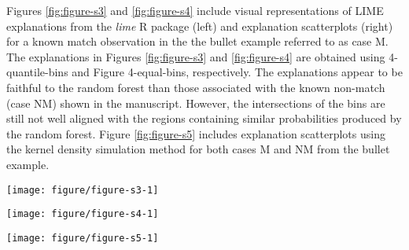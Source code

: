 \documentclass[9pt]{article}\usepackage[]{graphicx}\usepackage[]{color}
\newenvironment{knitrout}{}{} %
\begin{document}
Figures \ref{fig:figure-s3} and \ref{fig:figure-s4} include visual representations of LIME explanations from the \emph{lime} R package (left) and explanation scatterplots (right) for a known match observation in the the bullet example referred to as case M. The explanations in Figures \ref{fig:figure-s3} and \ref{fig:figure-s4} are obtained using 4-quantile-bins and Figure 4-equal-bins, respectively. The explanations appear to be faithful to the random forest than those associated with the known non-match (case NM) shown in the manuscript. However, the intersections of the bins are still not well aligned with the regions containing similar probabilities produced by the random forest. Figure \ref{fig:figure-s5} includes explanation scatterplots using the kernel density simulation method for both cases M and NM from the bullet example.

\vspace{0.5cm}



\renewcommand{\thefigure}{S3}
\begin{figure*}[!h]
\begin{knitrout}
\color{fgcolor}

{\centering \texttt{[image: figure/figure-s3-1]} 

}



\end{knitrout}
\caption{Explanation plot from \emph{lime} R package (left) and explanation scatterplot (right) for case M in the bullet test data for 4-quantile-bins.}
\label{fig:figure-s3}
\end{figure*}

\renewcommand{\thefigure}{S4}
\begin{figure*}[!h]
\begin{knitrout}
\color{fgcolor}

{\centering \texttt{[image: figure/figure-s4-1]} 

}



\end{knitrout}
\caption{Explanation plot from \emph{lime} R package (left) and explanation scatterplot (right) for case M in the bullet test data for 4-equal-bins.}
\label{fig:figure-s4}
\end{figure*}

\renewcommand{\thefigure}{S5}
\begin{figure*}[!h]
\begin{knitrout}
\color{fgcolor}

{\centering \texttt{[image: figure/figure-s5-1]} 

}



\end{knitrout}
\caption{Explanation scatterplots for LIME explanations using kernel density simulation for the cases M (top) and NM (bottom) of the bullet comparison test data.}
\label{fig:figure-s5}
\end{figure*}
\end{document}
